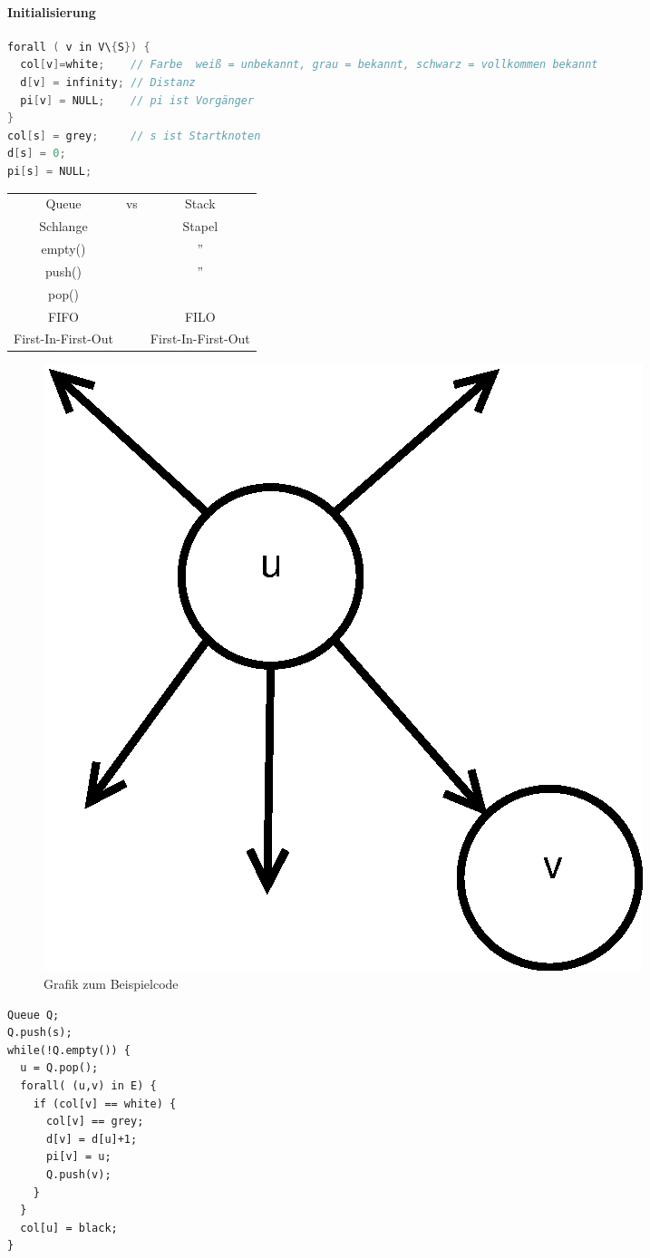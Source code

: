\paragraph{Initialisierung}
\begin{lstlisting}[language=C]
forall ( v in V\{S}) {
  col[v]=white;    // Farbe  weiß = unbekannt, grau = bekannt, schwarz = vollkommen bekannt
  d[v] = infinity; // Distanz
  pi[v] = NULL;    // pi ist Vorgänger
}
col[s] = grey;     // s ist Startknoten
d[s] = 0;
pi[s] = NULL;
\end{lstlisting}
\begin{tabular}{ccc}
	Queue & vs & Stack \\
	Schlange &$~$& Stapel \\
	empty() &$~$ & '' \\
	push() &$~$ & '' \\
	pop() &$~$ &  \\
	FIFO &$~$ & FILO \\
	First-In-First-Out &$~$& First-In-First-Out 
\end{tabular}
\begin{figure}
	\includegraphics[width=\linewidth]{15/Grafik/CodeBild}
	\caption{Grafik zum Beispielcode}
	\label{fig:CodeBild}
\end{figure}
\begin{lstlisting}
Queue Q;
Q.push(s);
while(!Q.empty()) {
  u = Q.pop();
  forall( (u,v) in E) {
    if (col[v] == white) {
      col[v] == grey;
      d[v] = d[u]+1;
      pi[v] = u;
      Q.push(v);
    }
  }
  col[u] = black;
}
\end{lstlisting}

